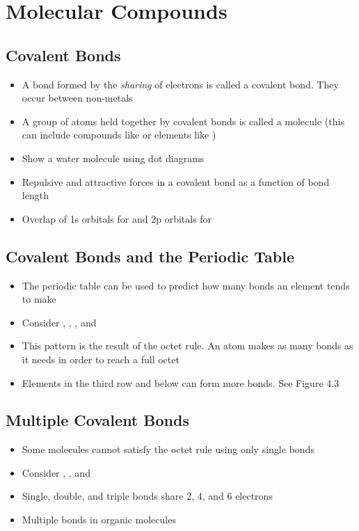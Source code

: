 \documentclass[12pt, openany, letterpaper]{memoir}
\begin{document}
\chapter{Molecular Compounds}
\section{Covalent Bonds}
\begin{itemize}
	\item A bond formed by the \emph{sharing} of electrons is called a covalent bond. They occur between non-metals
	\item A group of atoms held together by covalent bonds is called a molecule (this can include compounds like  or elements like )
	\item Show a water molecule using dot diagrams
	\item Repulsive and attractive forces in a covalent bond as a function of bond length
	\item Overlap of 1s orbitals for  and 2p orbitals for 	
\end{itemize}
\section{Covalent Bonds and the Periodic Table}
\begin{itemize}
	\item The periodic table can be used to predict how many bonds an element tends to make
	\item Consider , , , and 
	\item This pattern is the result of the octet rule. An atom makes as many bonds as it needs in order to reach a full octet
	\item Elements in the third row and below can form more bonds. See Figure 4.3	
\end{itemize}
\section{Multiple Covalent Bonds}
\begin{itemize}
	\item Some molecules cannot satisfy the octet rule using only single bonds
	\item Consider , , and 
	\item Single, double, and triple bonds share 2, 4, and 6 electrons
	\item Multiple bonds in organic molecules
\end{itemize}
\end{document}
